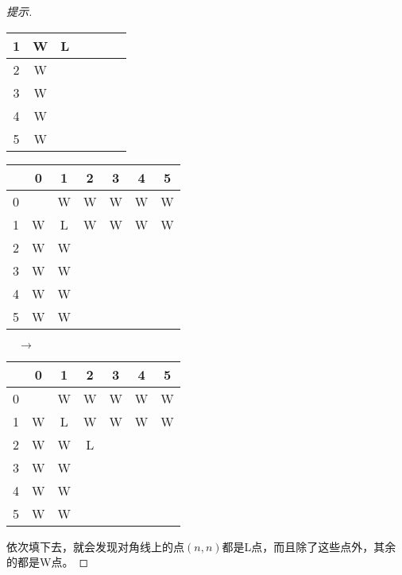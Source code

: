 \begin{proof}[提示]
\begin{center}
\begin{tabular}{|c|c|c|c|c|c|c|}
      1 & W & \cellcolor{blue!20}L &   &   &   &  \\\hline
      2 & W &   &   &   &   &  \\\hline
      3 & W &   &   &   &   &  \\\hline
      4 & W &   &   &   &   &  \\\hline
      5 & W &   &   &   &   &  \\\hline
    \end{tabular}
  \end{center}
  \begin{center}
    \begin{tabular}{|c|c|c|c|c|c|c|}
      \hline
        & 0 & 1 & 2 & 3 & 4 & 5\\\hline
      0 &   & W & W & W & W & W\\\hline
      1 & W & L & \cellcolor{blue!20}W & \cellcolor{blue!20}W & \cellcolor{blue!20}W & \cellcolor{blue!20}W\\\hline
      2 & W & \cellcolor{blue!20}W &   &   &   &  \\\hline
      3 & W & \cellcolor{blue!20}W &   &   &   &  \\\hline
      4 & W & \cellcolor{blue!20}W &   &   &   &  \\\hline
      5 & W & \cellcolor{blue!20}W &   &   &   &  \\\hline
    \end{tabular}
    $\quad\to\quad$
    \begin{tabular}{|c|c|c|c|c|c|c|}
      \hline
        & 0 & 1 & 2 & 3 & 4 & 5\\\hline
      0 &   & W & W & W & W & W\\\hline
      1 & W & L & W & W & W & W\\\hline
      2 & W & W & \cellcolor{blue!20}L  &   &   &  \\\hline
      3 & W & W &   &   &   &  \\\hline
      4 & W & W &   &   &   &  \\\hline
      5 & W & W &   &   &   &  \\\hline
    \end{tabular}
  \end{center}
依次填下去，就会发现对角线上的点$(n,n)$都是L点，而且除了这些点外，其余的都是W点。
\end{proof}

